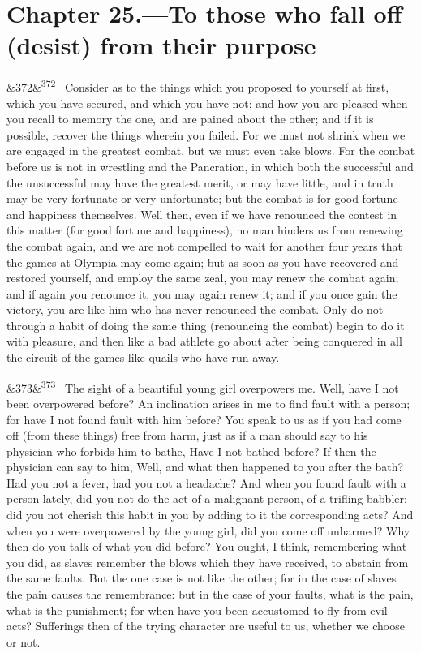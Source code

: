 \documentclass[12pt]{article}
\newcommand{\para}[1][]{\par\noindent\ifx&#1&\else\textsuperscript{\footnotesize #1}~\fi}
\begin{document}
\section*{Chapter 25.---To those who fall off (desist) from their purpose}

\para[372] Consider as to the things which you proposed to yourself at first, which you have secured, and which you have not; and how you are pleased when you recall to memory the one, and are pained about the other; and if it is possible, recover the things wherein you failed. For we must not shrink when we are engaged in the greatest combat, but we must even take blows. For the combat before us is not in wrestling and the Pancration, in which both the successful and the unsuccessful may have the greatest merit, or may have little, and in truth may be very fortunate or very unfortunate; but the combat is for good fortune and happiness themselves. Well then, even if we have renounced the contest in this matter (for good fortune and happiness), no man hinders us from renewing the combat again, and we are not compelled to wait for another four years that the games at Olympia may come again; but as soon as you have recovered and restored yourself, and employ the same zeal, you may renew the combat again; and if again you renounce it, you may again renew it; and if you once gain the victory, you are like him who has never renounced the combat. Only do not through a habit of doing the same thing (renouncing the combat) begin to do it with pleasure, and then like a bad athlete go about after being conquered in all the circuit of the games like quails who have run away.

\para[373] The sight of a beautiful young girl overpowers me. Well, have I not been overpowered before? An inclination arises in me to find fault with a person; for have I not found fault with him before? You speak to us as if you had come off (from these things) free from harm, just as if a man should say to his physician who forbids him to bathe, Have I not bathed before? If then the physician can say to him, Well, and what then happened to you after the bath? Had you not a fever, had you not a headache? And when you found fault with a person lately, did you not do the act of a malignant person, of a trifling babbler; did you not cherish this habit in you by adding to it the corresponding acts? And when you were overpowered by the young girl, did you come off unharmed? Why then do you talk of what you did before? You ought, I think, remembering what you did, as slaves remember the blows which they have received, to abstain from the same faults. But the one case is not like the other; for in the case of slaves the pain causes the remembrance: but in the case of your faults, what is the pain, what is the punishment; for when have you been accustomed to fly from evil acts? Sufferings then of the trying character are useful to us, whether we choose or not.
\end{document}
